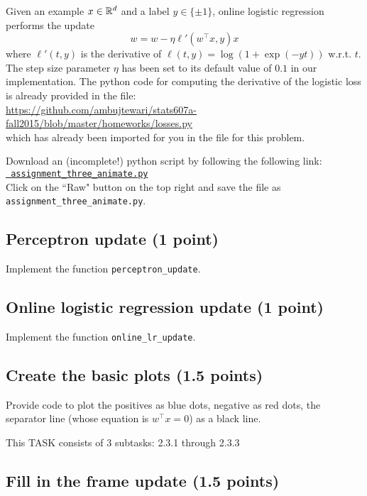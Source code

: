 \documentclass{article}
\begin{document}
Given an example $x \in \mathbb{R}^d$ and a label $y \in \{\pm 1\}$,
online logistic regression performs the update
$$
w = w - \eta \ell'(w^\top x, y) x
$$
where $\ell'(t, y)$ is the derivative of $\ell(t,y) = \log(1+\exp(-yt))$ w.r.t. $t$. The step size parameter
$\eta$ has been set to its default value of $0.1$ in our implementation. The python code for computing the derivative
of the logistic loss is already provided in the file:\\
\url{https://github.com/ambujtewari/stats607a-fall2015/blob/master/homeworks/losses.py}\\
which has already been imported for you in the file for this problem.

Download an (incomplete!) python script by following the following
link:\\
\href{https://github.com/ambujtewari/stats607a-fall2015/blob/master/homeworks/assignment_three_animate.py}{\tt
assignment\_three\_animate.py} \\
Click on the ``Raw" button on the top right and save the file as {\tt
assignment\_three\_animate.py}.

\subsection{Perceptron update (1 point)}

Implement the function {\tt perceptron\_update}.

\subsection{Online logistic regression update (1 point)}

Implement the function {\tt online\_lr\_update}.

\subsection{Create the basic plots (1.5 points)}

Provide code to plot the positives as blue dots, negative as red dots, the separator line (whose equation is $w^\top x = 0$) as a black line.

This TASK consists of 3 subtasks: 2.3.1 through 2.3.3

\subsection{Fill in the frame update (1.5 points)}
\end{document}
